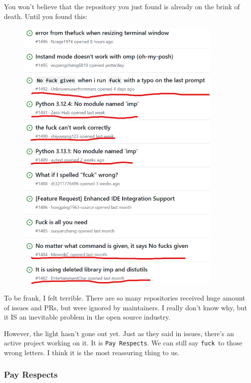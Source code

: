 \documentclass[12pt]{ctexart}
\begin{document}
You won't believe that the repository you just found is
already on the brink of death. Until you found this:

\begin{figure}[H]
    \centering
    \includegraphics[width=0.9\textwidth,keepaspectratio]{assets/Linux/2.5 What's the first word when messing up a command/3.png}
\end{figure}

To be frank, I felt terrible. There are so many repositories received
huge amount of issues and PRs, but were ignored by maintainers. I really
don't know why, but it IS an inevitable problem in the
open source industry.

However, the light hasn't gone out yet. Just as they
said in issues, there's an active project working on it.
It is \texttt{Pay\ Respects}. We can still say \texttt{fuck}\ to those
wrong letters. I think it is the most reassuring thing to us.

\subsubsection{\textbf{Pay Respects}}
\end{document}
